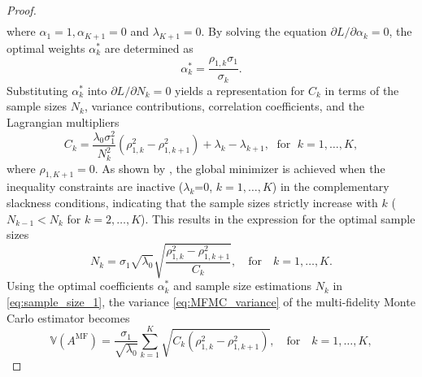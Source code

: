 \begin{proof}
\begin{align*}
\end{align*}
%
where $\alpha_1 = 1, \alpha_{K+1} = 0$ and $\lambda_{K+1} = 0$. By solving the equation $\partial L/\partial \alpha_k=0$, the optimal weights $\alpha_k^*$ are determined as
%
\[
\alpha_k^*=\frac{\rho_{1,k}\sigma_1}{\sigma_k}.
\]
%
Substituting $\alpha_k^*$ into $\partial L/\partial N_k=0$ yields a representation for $C_k$ in terms of the sample sizes $N_k$, variance contributions, correlation coefficients, and the Lagrangian multipliers
\begin{equation*}
    C_k=\frac{\lambda_0\sigma_1^2}{N_k^2}\left(\rho_{1,k}^2-\rho_{1,k+1}^2\right)+\lambda_k-\lambda_{k+1}, \;\text{ for }\; k=1,\ldots,K, 
\end{equation*}
where $\rho_{1,K+1} = 0$. As shown by  \cite{PeWiGu:2016}, the global minimizer is achieved when the inequality constraints are inactive ($\lambda_k$=0, $k=1,\dots, K$) in the complementary slackness conditions, indicating that the sample sizes strictly increase with $k$ ($N_{k-1}< N_k$ for $k=2,\ldots, K$). This results in the expression for the optimal sample sizes
\begin{equation}
\label{eq:sample_size_1}
    N_k = \sigma_1\sqrt{\lambda_0}\sqrt{\frac{\rho_{1,k}^2-\rho_{1,k+1}^2}{C_k}},\quad \text{for}\quad  k=1,\ldots,K.
\end{equation}
Using the optimal coefficients $\alpha_k^*$ and sample size estimations $N_k$ in \eqref{eq:sample_size_1}, the variance \eqref{eq:MFMC_variance} of the multi-fidelity Monte Carlo estimator becomes
%
\begin{equation*} \label{eq:MFMC_variance2}
    \mathbb{V}\left(A^{\text{MF}}\right) = \frac{\sigma_1}{\sqrt{\lambda_0}}\sum_{k=1}^K\sqrt{C_k\left(\rho_{1,k}^2-\rho_{1,k+1}^2\right)}, \quad \text{for}\quad  k=1,\ldots,K,

\end{equation*}
\end{proof}
